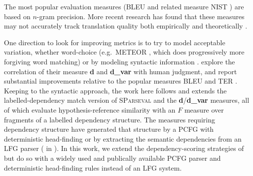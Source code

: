 \documentclass[11pt]{article}
\begin{document}
The most popular evaluation measures (BLEU and related measure
NIST \cite{doddington02nist}) are based on $n$-gram precision.  More
recent research has found that these measures may not accurately track
translation quality both empirically \cite{charniak03syntaxlmmt} and
theoretically \cite{callisonburch06bleuproblems}.

One direction to look for improving metrics is to try to model
acceptable variation, whether word-choice (e.g.\ METEOR
\cite{banerjee05meteor}, which does progressively more forgiving
word matching) or by modeling syntactic information
\cite{liu05syntaxformteval,owczarzak07labelleddepseval}.  
 explore the correlation of
their measure \textbf{d} and \textbf{d\_var} with human judgment, and
report substantial improvements relative to the popular measures BLEU
and TER \cite{snover06ter}.  
%
Keeping to the syntactic approach, the work here follows and extends
the labelled-dependency match version of \textsc{SParseval}
\cite{roark06:sparseval} and the \textbf{d}/\textbf{d\_var}
\cite{owczarzak07labelleddepseval} measures, all of which evaluate
hypothesis-reference similarity with an $F$ measure over fragments of
a labelled dependency structure.  
%
The measures requiring dependency structure have generated that structure by a
PCFG with deterministic head-finding
\cite{liu05syntaxformteval,roark06:sparseval} or by extracting the
semantic dependencies from an LFG parser
( in ).
In this work, we extend the dependency-scoring strategies of
 but do so with a
widely used and publically available PCFG parser and
deterministic head-finding rules instead of an LFG system.


\end{document}
